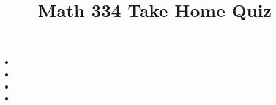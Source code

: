 \documentclass{article}
\begin{document}
\title{Math 334 Take Home Quiz}
\maketitle
\begin{itemize}[label=]
	\item 
	\item 
	\item 
	\item 
\end{itemize}
\end{document}
